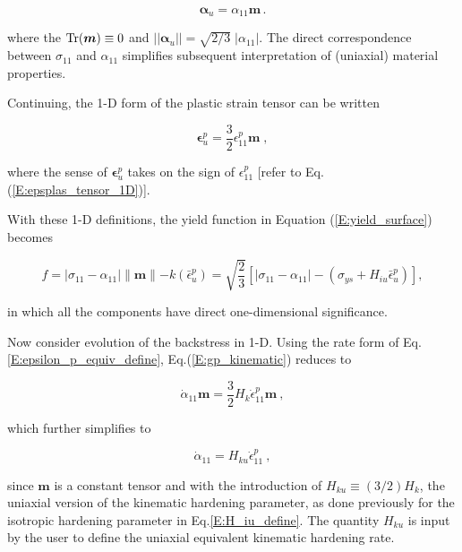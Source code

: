 \documentclass[11pt]{report}
\numberwithin{equation}{section}
\newcommand{\bmf } {\boldsymbol }
\begin{document}
\begin{equation}\label{E:alpha_u_defined}
 \bmf{\alpha}_u=\alpha_{11}\bmf{m}\,.
\end{equation}
 
\noindent where the $\rm{Tr}(\bmf{m})\equiv 0$ and $||\bmf{\alpha}_u||=\sqrt{2/3}\; |\alpha_{11}|$.
The direct correspondence between $\sigma_{11}$ and $\alpha_{11}$ simplifies
subsequent interpretation of (uniaxial) material properties.

Continuing, the 1-D form of the plastic strain tensor can be written

\begin{equation}\label{E:epsilon_p_equiv_define}
\bmf{\epsilon}^p_u=\textstyle {\frac{3}{2}}\epsilon^p_{11} \bmf{m}\;,
\end{equation}

\noindent where the sense of $\bmf {\epsilon}^p_u$ takes on the sign of $\epsilon^p_{11}$ 
[refer to Eq. (\ref{E:epsplas_tensor_1D})]. 

With these 1-D definitions, the yield function in Equation (\ref{E:yield_surface}) becomes

\begin{equation}\label{E:f_define_1D}
f=|\sigma_{11}-\alpha_{11}|\parallel \bmf{m} \parallel - k(\bar \epsilon^p_u) =  
\sqrt{\textstyle{\frac{2}{3}}}\left[|\sigma_{11}-\alpha_{11}|-\left(\sigma_{ys}+
H_{iu} \bar\epsilon^p_u \right) \right],
\end{equation}


\noindent in which all the components have direct one-dimensional significance.

Now consider evolution of the backstress in 1-D.  Using the rate form of
Eq.\;\eqref{E:epsilon_p_equiv_define}, Eq.\;(\ref{E:gp_kinematic}) reduces to

\begin{equation}
\dot\alpha_{11}\bmf{m}=\textstyle{\frac{3}{2}} 
H_k \dot \epsilon^p_{11} \bmf{m}~,
\end{equation}

\noindent which further simplifies to 

\begin{equation}
\dot\alpha_{11}=H_{ku}\dot\epsilon^p_{11}~,
\end{equation}

\noindent since $\bmf m$ is a constant tensor and with the introduction 
of $H_{ku} \equiv (3/2)H_k$, the uniaxial version of the kinematic 
hardening parameter, as done previously for the isotropic hardening parameter
in Eq.\;\eqref{E:H_iu_define}. The quantity $H_{ku}$ is input by the user to define the
uniaxial equivalent kinematic hardening rate. 
\end{document}
